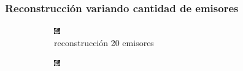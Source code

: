 \documentclass[11pt]{beamer}
\begin{document}
\begin{frame}
    \frametitle{Reconstrucción variando cantidad de emisores}
    
    \begin{figure}[H]
        \centering
    
        \begin{subfigure}[h]{0.3\textwidth} 
            \includegraphics[width=\textwidth]{img/tomo_emisores_20.png}
            \caption{reconstrucción 20 emisores}
            \label{fig:reconstruccion 20 emisores}
        \end{subfigure}%
        \hfill
        \begin{subfigure}[h]{0.3\textwidth}
            \includegraphics[width=\textwidth]{img/tomo_emisores_60.png}

\end{subfigure}
\end{figure}
\end{frame}
\end{document}

